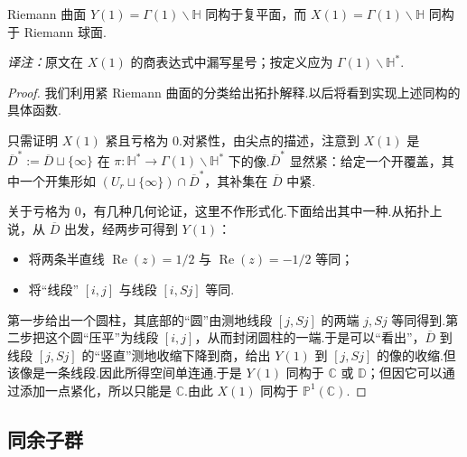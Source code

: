 \begin{corollary*}

Riemann 曲面 $Y(1)=\Gamma(1)\backslash\mathbb H$ 同构于复平面，而 $X(1)=\Gamma(1)\backslash\mathbb H$ 同构于 Riemann 球面.

\end{corollary*}

\noindent\textit{译注：}原文在 $X(1)$ 的商表达式中漏写星号；按定义应为 $\Gamma(1)\backslash\mathbb H^*$.

\begin{proof}

我们利用紧 Riemann 曲面的分类给出拓扑解释.以后将看到实现上述同构的具体函数.



只需证明 $X(1)$ 紧且亏格为 $0$.对紧性，由尖点的描述，注意到 $X(1)$ 是 $\overline D^*:=\overline D\sqcup\{\infty\}$ 在 $\pi:\mathbb H^*\longrightarrow\Gamma(1)\backslash\mathbb H^*$ 下的像.$\overline D^*$ 显然紧：给定一个开覆盖，其中一个开集形如 $(U_r\sqcup\{\infty\})\cap\overline D^*$，其补集在 $\overline D$ 中紧.



关于亏格为 $0$，有几种几何论证，这里不作形式化.下面给出其中一种.从拓扑上说，从 $\overline D$ 出发，经两步可得到 $Y(1)$：

\begin{itemize}

\item 将两条半直线 $\operatorname{Re}(z)=1/2$ 与 $\operatorname{Re}(z)=-1/2$ 等同；

\item 将``线段'' $[i,j]$ 与线段 $[i,Sj]$ 等同.

\end{itemize}

第一步给出一个圆柱，其底部的``圆''由测地线段 $[j,Sj]$ 的两端 $j,Sj$ 等同得到.第二步把这个圆``压平''为线段 $[i,j]$，从而封闭圆柱的一端.于是可以``看出''，$\overline D$ 到线段 $[j,Sj]$ 的``竖直''测地收缩下降到商，给出 $Y(1)$ 到 $[j,Sj]$ 的像的收缩.但该像是一条线段.因此所得空间单连通.于是 $Y(1)$ 同构于 $\mathbb C$ 或 $\mathbb D$；但因它可以通过添加一点紧化，所以只能是 $\mathbb C$.由此 $X(1)$ 同构于 $\mathbb P^1(\mathbb C)$.

\end{proof}



\subsection{同余子群}\label{sec:modular-1-1-7}

